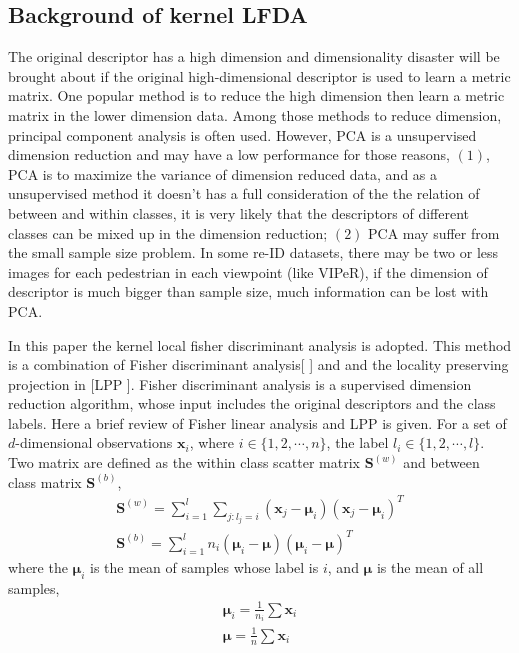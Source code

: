 \documentclass[conference,compsoc]{IEEEtran}
\begin{document}
\subsection{Background of kernel LFDA}
The original descriptor has a high dimension and dimensionality disaster will be brought about if the original high-dimensional descriptor is used to learn a metric matrix. One popular method is to reduce the high dimension then learn a metric matrix in the lower dimension data. Among those methods to reduce dimension, principal component analysis is often used. However, PCA is a unsupervised dimension reduction and may have a low performance for those reasons, $(1)$, PCA is to maximize the variance of dimension reduced data, and as a unsupervised method it doesn't has a full consideration of the the relation of between and within classes, it is very likely that the descriptors of different classes can be mixed up in the dimension reduction; $(2)$ PCA may suffer from the small sample size problem. In some re-ID datasets, there may be two or less images for each pedestrian in each viewpoint (like VIPeR), if the dimension of descriptor is much bigger than sample size, much information can be lost with PCA.

In this paper the kernel local fisher discriminant analysis is adopted. This method is a combination of Fisher discriminant analysis[ ] and and the locality preserving projection in [LPP ]. 
Fisher discriminant analysis is a supervised dimension reduction algorithm, whose input includes the original descriptors and the class labels. Here a brief review of Fisher linear analysis and LPP is given. For a set of $d$-dimensional observations $\bm{x}_i$, where $i\in\{1,2,\cdots,n\}$, the label $l_i\in\{1,2,\cdots,l\}$. Two matrix are defined as the within class scatter matrix $\bm{S}^{(w)}$ and between class matrix
$\bm{S}^{(b)}$, 
\begin{equation}
\begin{aligned}
\bm{S}^{(w)} = \mathop{\sum} _{i=1}^l\mathop{\sum}_{j:l_j = i} (\bm{x}_j - \bm{\mu}_i)(\bm{x}_j - \bm{\mu}_i)^T \\
\bm{S}^{(b)} = \mathop{\sum} _{i=1}^l n_i(\bm{\mu}_i - \bm{\mu})(\bm{\mu}_i - \bm{\mu})^T
\end{aligned}
\end{equation}
where the $\bm{\mu}_i$ is the mean of samples whose label is $i$, and $\bm{\mu}$ is the mean of all samples,
\begin{equation}
\begin{aligned}
\bm{\mu}_i = \frac{1}{n_i} \sum \bm{x}_i \\
\bm{\mu} = \frac{1}{n} \sum \bm{x}_i
\end{aligned}
\end{equation}
\end{document}
